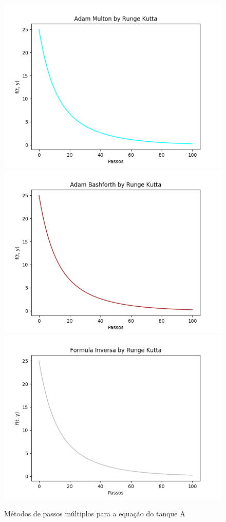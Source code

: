 \documentclass[12pt]{article}%
\begin{document}
    \begin{figure}[H]
        \begin{center}
            \includegraphics[width=.4\textwidth]{problemas/metodos_q1/tanque_a_multon.png}
            \includegraphics[width=.4\textwidth]{problemas/metodos_q1/tanque_a_bashforth.png}
            \includegraphics[width=.4\textwidth]{problemas/metodos_q1/tanque_a_inversa.png}
        \end{center}
        \caption{Métodos de passos múltiplos para a equação do tanque A}
    \end{figure}
\end{document}
